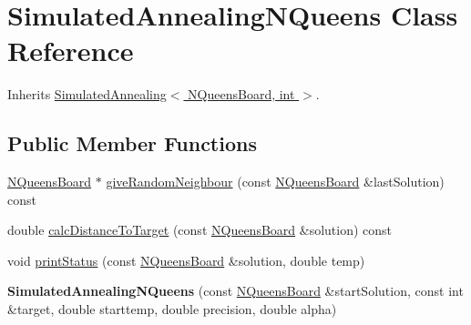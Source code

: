 \hypertarget{class_simulated_annealing_n_queens}{
\section{SimulatedAnnealingNQueens Class Reference}
\label{class_simulated_annealing_n_queens}
}


Inherits \hyperlink{class_simulated_annealing}{SimulatedAnnealing$<$ NQueensBoard, int $>$}.\subsection*{Public Member Functions}
\begin{DoxyCompactItemize}
\item 
\hyperlink{class_n_queens_board}{NQueensBoard} $\ast$ \hyperlink{class_simulated_annealing_n_queens_a137985c9ff6d0e88cdaf5859c29b7e19}{giveRandomNeighbour} (const \hyperlink{class_n_queens_board}{NQueensBoard} \&lastSolution) const 
\item 
double \hyperlink{class_simulated_annealing_n_queens_a1cd2713f3c67f9c0b4d6ce64d31690ad}{calcDistanceToTarget} (const \hyperlink{class_n_queens_board}{NQueensBoard} \&solution) const 
\item 
void \hyperlink{class_simulated_annealing_n_queens_a8165b39087c35fa62127c7f392e25d8b}{printStatus} (const \hyperlink{class_n_queens_board}{NQueensBoard} \&solution, double temp)
\item 
\hypertarget{class_simulated_annealing_n_queens_a73633cbb6d1cb2e9aefa2b43a57a4f99}{
{\bfseries SimulatedAnnealingNQueens} (const \hyperlink{class_n_queens_board}{NQueensBoard} \&startSolution, const int \&target, double starttemp, double precision, double alpha)}
\label{class_simulated_annealing_n_queens_a73633cbb6d1cb2e9aefa2b43a57a4f99}

\end{DoxyCompactItemize}



